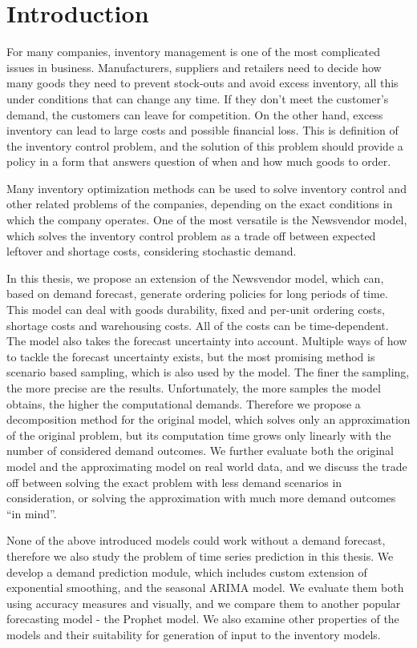 \documentclass[11pt,a4paper]{article}
\begin{document}
\section{Introduction}
For many companies, inventory management is one of the most complicated issues in business. Manufacturers, suppliers and retailers need to decide how many goods they need to prevent stock-outs and avoid excess inventory, all this under conditions that can change any time. If they don't meet the customer's demand, the customers can leave for competition. On the other hand, excess inventory can lead to large costs and possible financial loss. This is definition of the inventory control problem, and the solution of this problem should provide a policy in a form that answers question of when and how much goods to order.

Many inventory optimization methods can be used to solve inventory control and other related problems of the companies, depending on the exact conditions in which the company operates. One of the most versatile is the Newsvendor model, which solves the inventory control problem as a trade off between expected leftover and shortage costs, considering stochastic demand.

In this thesis, we propose an extension of the Newsvendor model, which can, based on demand forecast, generate ordering policies for long periods of time. This model can deal with goods durability, fixed and per-unit ordering costs, shortage costs and warehousing costs. All of the costs can be time-dependent. The model also takes the forecast uncertainty into account. Multiple ways of how to tackle the forecast uncertainty exists, but the most promising method is scenario based sampling, which is also used by the model. The finer the sampling, the more precise are the results. Unfortunately, the more samples the model obtains, the higher the computational demands. Therefore we propose a decomposition method for the original model, which solves only an approximation of the original problem, but its computation time grows only linearly with the number of considered demand outcomes. We further evaluate both the original model and the approximating model on real world data, and we discuss the trade off between solving the exact problem with less demand scenarios in consideration, or solving the approximation with much more demand outcomes ``in mind''.

None of the above introduced models could work without a demand forecast, therefore we also study the problem of time series prediction in this thesis.
We develop a demand prediction module, which includes custom extension of exponential smoothing, and the seasonal ARIMA model. We evaluate them both using accuracy measures and visually, and we compare them to another popular forecasting model - the Prophet model. We also examine other properties of the models and their suitability for generation of input to the inventory models.
\end{document}
